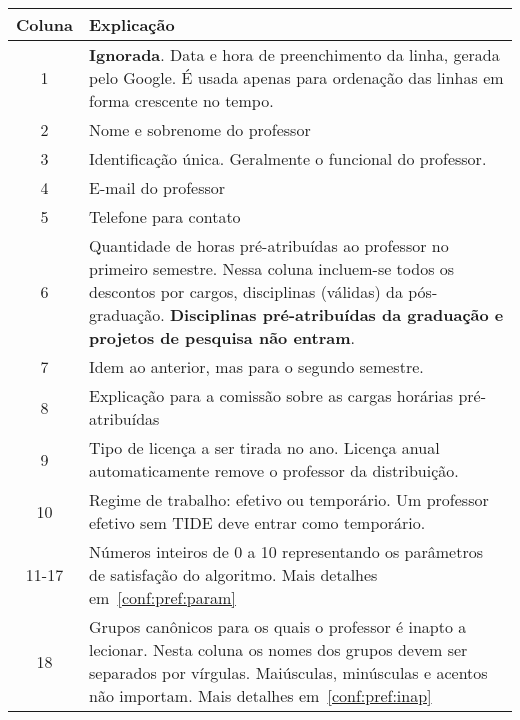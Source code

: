 \documentclass[a4paper, 12pt]{report}
\begin{document}
\begin{table}[ht!]
  \centering
  \begin{tabularx}{0.95\textwidth}{c|X}
    \hline
    Coluna & Explicação \\ \hline \hline

    1 & \textbf{Ignorada}. Data e hora de preenchimento da linha,
    gerada pelo Google. É usada apenas para ordenação das linhas em
    forma crescente no tempo.\\  \hline

    2 & Nome e sobrenome do professor \\ \hline

    3 & Identificação única. Geralmente o funcional do professor. \\ \hline

    4 & E-mail do professor \\ \hline

    5 & Telefone para contato \\ \hline

    6 & Quantidade de horas pré-atribuídas ao professor no primeiro
    semestre. Nessa coluna incluem-se todos os descontos por cargos,
    disciplinas (válidas) da pós-graduação. \textbf{Disciplinas
      pré-atribuídas da graduação e projetos de pesquisa não
      entram}. \\ \hline

    7 & Idem ao anterior, mas para o segundo semestre. \\ \hline

    8 & Explicação para a comissão sobre as cargas horárias
    pré-atribuídas \\ \hline

    9 & Tipo de licença a ser tirada no ano. Licença anual
    automaticamente remove o professor da distribuição. \\ \hline

    10 & Regime de trabalho: efetivo ou temporário. Um professor
    efetivo sem TIDE deve entrar como temporário. \\ \hline

    11-17 & Números inteiros de 0 a 10 representando os parâmetros de
    satisfação do algoritmo. Mais detalhes em~\ref{conf:pref:param} \\
    \hline

    18 & Grupos canônicos para os quais o professor é inapto a
    lecionar. Nesta coluna os nomes dos grupos devem ser separados por
    vírgulas. Maiúsculas, minúsculas e acentos não importam. Mais
    detalhes em~\ref{conf:pref:inap} \\ \hline


\end{tabularx}
\end{table}
\end{document}

